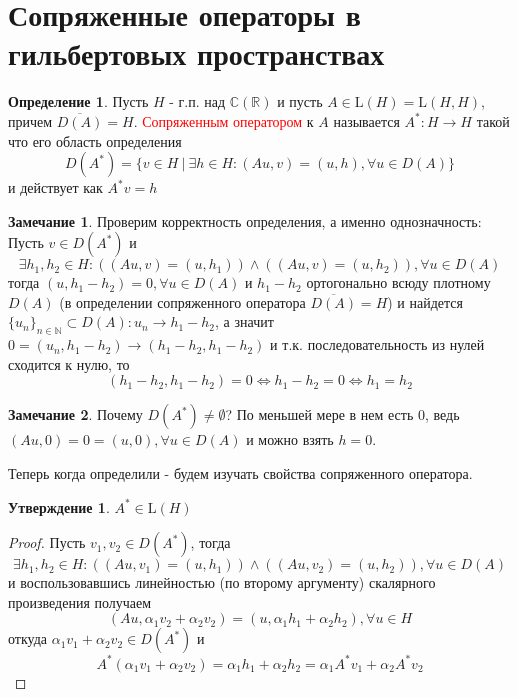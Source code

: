 \documentclass[12pt,a4paper]{article}
\theoremstyle{definition}
\newtheorem{definition}{Определение}[section]
\newtheorem{corollarydf}{Замечание}[definition]
\newtheorem{proposition}{Утверждение}[section]
\newcommand{\Real}{\mathbb{R}}
\newcommand{\Cmplx}{\mathbb{C}}
\newcommand{\Natural}{\mathbb{N}}
\newcommand{\setbuild}[2]{\{#1\:|\:#2\}}
\newcommand{\linear}[2]{\textrm{L}(#1, #2)}
\newcommand{\linearo}[1]{\textrm{L}(#1)}
\newcommand{\seq}[2]{\{#1\}_{#2}}
\begin{document}
\section{Сопряженные операторы в гильбертовых пространствах}
\begin{definition}
	Пусть $H$ - г.п. над $\Cmplx (\Real)$ и пусть $A \in \linearo{H} = \linear{H}{H}$, причем $\overline{D(A)} = H$. \textcolor{red}{Сопряженным оператором} к $A$ называется $A^*: H \to H$ такой что его область определения
	$$D(A^*) = \setbuild{v\in H}{\exists h \in H: (Au, v) = (u,h), \forall u \in D(A)}$$ 
	и действует как $A^* v = h$
\end{definition}
\begin{corollarydf} 
Проверим корректность определения, а именно однозначность:
Пусть $v\in D(A^*)$ и 
$$\exists h_1, h_2 \in H: \left((Au, v) = (u, h_1)\right) \wedge \left((Au, v) = (u, h_2)\right), \forall u \in D(A)$$
тогда $(u, h_1 - h_2) = 0, \forall u \in D(A)$ и $h_1 - h_2$ ортогонально всюду плотному $D(A)$ (в определении сопряженного оператора $\overline{D(A)} = H$) и найдется $\seq{u_n}{n\in\Natural} \subset D(A): u_n \to h_1 - h_2$, а значит $0 = (u_n, h_1 - h_2) \to (h_1 - h_2, h_1 - h_2)$ и т.к. последовательность из нулей сходится к нулю, то 
$$(h_1 - h_2, h_1 - h_2) = 0 \Leftrightarrow h_1 - h_2 = 0 \Leftrightarrow h_1 = h_2$$
\end{corollarydf}
\begin{corollarydf}
	Почему $D(A^*) \neq \emptyset$? По меньшей мере в нем есть 0, ведь $(Au, 0) = 0 = (u, 0), \forall u \in D(A)$ и можно взять $h = 0$.
\end{corollarydf}

Теперь когда определили - будем изучать свойства сопряженного оператора.

\begin{proposition}
	$A^* \in \linearo{H}$
\end{proposition}
\begin{proof}
	Пусть $v_1, v_2 \in D(A^*)$, тогда 
	$$\exists h_1, h_2 \in H: \left((Au, v_1) = (u, h_1)\right) \wedge \left((Au, v_2) = (u, h_2)\right), \forall u \in D(A)$$
	и воспользовавшись линейностью (по второму аргументу) скалярного произведения получаем
	$$(Au, \alpha_1 v_2 + \alpha_2 v_2) = (u, \alpha_1 h_1 + \alpha_2 h_2), \forall u \in H$$
	откуда $\alpha_1 v_1 + \alpha_2 v_2 \in D(A^*)$ и
	$$A^* (\alpha_1 v_1 + \alpha_2 v_2) = \alpha_1 h_1 + \alpha_2 h_2 = \alpha_1 A^* v_1 + \alpha_2 A^* v_2$$
\end{proof}
\end{document}
